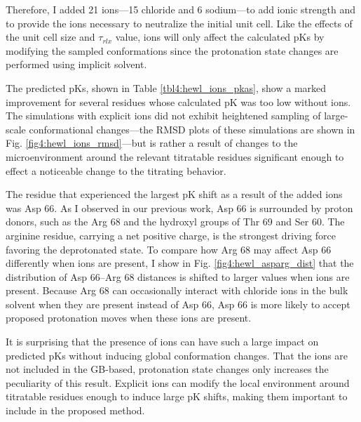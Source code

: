 Therefore, I added 21 ions---15 chloride and 6 sodium---to add ionic strength
and to provide the ions necessary to neutralize the initial unit cell. Like the
effects of the unit cell size and $\tau _ {rlx}$ value, ions will only affect
the calculated pKs by modifying the sampled conformations since the
protonation state changes are performed using implicit solvent.

The predicted pKs, shown in Table \ref{tbl4:hewl_ions_pkas}, show a
marked improvement for several residues whose calculated pK was too low
without ions.  The simulations with explicit ions did not exhibit heightened
sampling of large-scale conformational changes---the RMSD plots of these
simulations are shown in Fig. \ref{fig4:hewl_ions_rmsd}---but is rather a result
of changes to the microenvironment around the relevant titratable residues
significant enough to effect a noticeable change to the titrating behavior.

The residue that experienced the largest pK shift as a result of the
added ions was Asp 66. As I observed in our previous work, Asp 66 is surrounded
by proton donors, such as the Arg 68 and the hydroxyl groups of Thr 69 and Ser
60. \cite{Swails_JChemTheoryComput_2012_v8_p4393} The arginine residue, carrying
a net positive charge, is the strongest driving force favoring the deprotonated
state. To compare how Arg 68 may affect Asp 66 differently when ions are
present, I show in Fig. \ref{fig4:hewl_asparg_dist} that the distribution of
Asp 66--Arg 68 distances is shifted to larger values when ions are present.
Because Arg 68 can occasionally interact with chloride ions in the bulk solvent
when they are present instead of Asp 66, Asp 66 is more likely to accept
proposed protonation moves when these ions are present.

It is surprising that the presence of ions can have such a large impact on
predicted pKs without inducing global conformation changes. That the ions
are not included in the GB-based, protonation state changes only increases the
peculiarity of this result. Explicit ions can modify the local environment
around titratable residues enough to induce large pK shifts, making them
important to include in the proposed method.

